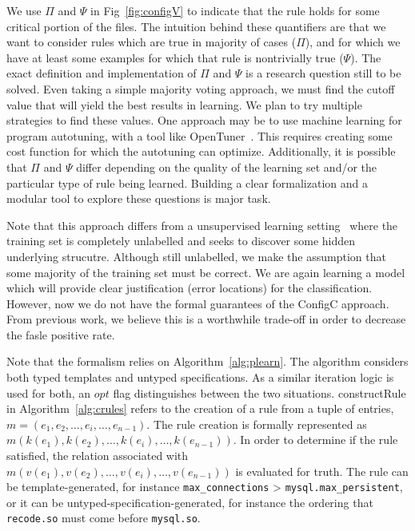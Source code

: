 We use $\Pi$ and $\Psi$ in Fig~\ref{fig:configV} to indicate that the rule holds for some critical portion of the files.
The intuition behind these quantifiers are that we want to consider rules which are true in majority of cases ($\Pi$), 
and for which we have at least some examples for which that rule is nontrivially true ($\Psi$).
The exact definition and implementation of $\Pi$ and $\Psi$ is a research question still to be solved.
Even taking a simple majority voting approach, we must find the cutoff value that will yield the best results in learning.
We plan to try multiple strategies to find these values.
One approach may be to use machine learning for program autotuning, with a tool like OpenTuner~\cite{ansel:pact:2014}.
This requires creating some cost function for which the autotuning can optimize.
Additionally, it is possible that $\Pi$ and $\Psi$ differ depending on the quality of the learning set and/or the particular type of rule being learned.
Building a clear formalization and a modular tool to explore these questions is major task.

Note that this approach differs from a unsupervised learning setting~\cite{hastie2009unsupervised} where the training set is completely unlabelled and seeks to discover some hidden underlying strucutre.
Although still unlabelled, we make the assumption that some majority of the training set must be correct.
We are again learning a model which will provide clear justification (error locations) for the classification.
However, now we do not have the formal guarantees of the ConfigC approach.
From previous work, we believe this is a worthwhile trade-off in order to decrease the fasle positive rate.

\iffalse
Note that the formalism relies on Algorithm~\ref{alg:plearn}. The algorithm considers both typed templates and
untyped specifications. As a similar iteration logic is used for both, an $opt$ flag distinguishes between the two situations.
constructRule in Algorithm~\ref{alg:crules} refers to the creation of a rule from a tuple of entries, 
$m = (e_1, e_2, \ldots, e_i, \ldots, e_{n-1})$.
The rule creation is formally represented as $m(k(e_1), k(e_2), \ldots, k(e_i), \ldots, k(e_{n-1}))$. 
In order to determine if the rule satisfied, the relation associated with $m(v(e_1), v(e_2), \ldots, v(e_i), \ldots, v(e_{n-1}))$ is evaluated for truth.
The rule can be template-generated, for instance {\tt max\_connections} > {\tt mysql.max\_persistent}, or
it can be untyped-specification-generated, for instance the ordering that {\tt recode.so} must come before 
{\tt mysql.so}.

